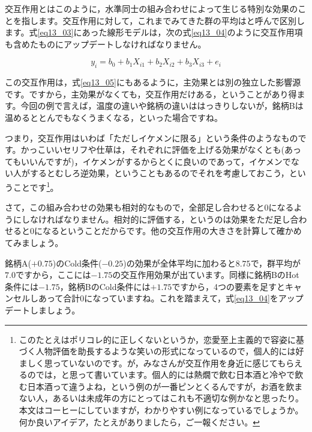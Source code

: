 \documentclass{ltjbook}
\begin{document}
交互作用とはこのように，水準同士の組み合わせによって生じる特別な効果のことを指します。交互作用に対して，これまでみてきた群の平均はと呼んで区別します。式\ref{eq13_03}にあった線形モデルは，次の式\ref{eq13_04}のように交互作用項も含めたものにアップデートしなければなりません。

\begin{equation}
	\label{eq13_05}
	y_i = b_0 + b_1 X_{i1}+ b_2 X_{i2} + b_3 X_{i3} + e_{i}
\end{equation}

この交互作用は，式\ref{eq13_05}にもあるように，主効果とは別の独立した影響源です。ですから，主効果がなくても，交互作用だけある，ということがあり得ます。今回の例で言えば，温度の違いや銘柄の違いははっきりしないが，銘柄Bは温めるととんでもなくうまくなる，といった場合ですね。

つまり，交互作用はいわば「ただしイケメンに限る」という条件のようなものです。かっこいいセリフや仕草は，それぞれに評価を上げる効果がなくとも(あってもいいんですが)，イケメンがするからとくに良いのであって，イケメンでない人がするとむしろ逆効果，ということもあるのでそれを考慮しておこう，ということです\footnote{このたとえはポリコレ的に正しくないというか，恋愛至上主義的で容姿に基づく人物評価を助長するような笑いの形式になっているので，個人的には好ましく思っていないのです。が，みなさんが交互作用を身近に感じてもらえるのでは，と思って書いています。個人的には熱燗で飲む日本酒と冷やで飲む日本酒って違うよね，という例のが一番ピンとくるんですが，お酒を飲まない人，あるいは未成年の方にとってはこれも不適切な例かなと思ったり。本文はコーヒーにしていますが，わかりやすい例になっているでしょうか。何か良いアイデア，たとえがありましたら，ご一報ください。}。

さて，この組み合わせの効果も相対的なもので，全部足し合わせると$0$になるようにしなければなりません。相対的に評価する，というのは効果をただ足し合わせると$0$になるということだからです。他の交互作用の大きさを計算して確かめてみましょう。

銘柄A($+0.75$)のCold条件($-0.25$)の効果が全体平均に加わると$8.75$で，群平均が$7.0$ですから，ここには$-1.75$の交互作用効果が出ています。同様に銘柄BのHot条件には$-1.75$，銘柄BのCold条件には$+1.75$ですから，4つの要素を足すとキャンセルしあって合計$0$になっていますね。これを踏まえて，式\ref{eq13_04}をアップデートしましょう。
\end{document}
